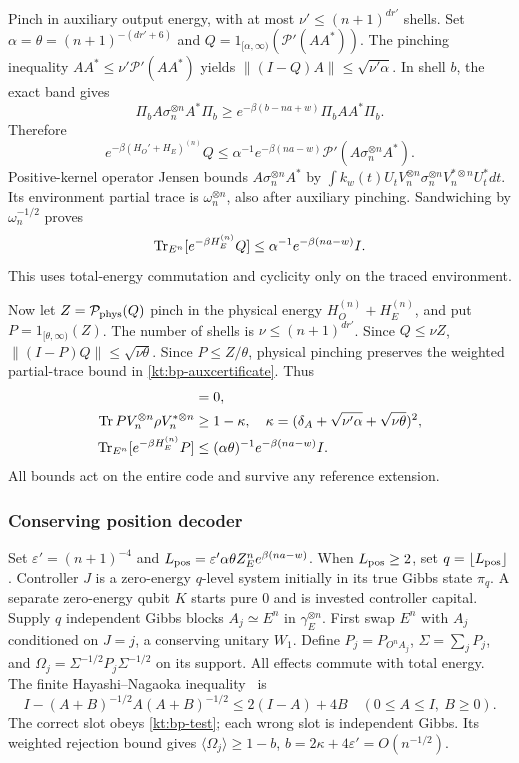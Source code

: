 Pinch in auxiliary output energy, with at most $\nu'\le(n+1)^{dr'}$
shells. Set $\alpha=\theta=(n+1)^{-(dr'+6)}$ and
$Q=1_{[\alpha,\infty)}(\mathcal P'(AA^*))$.
The pinching inequality $AA^*\le\nu'\mathcal P'(AA^*)$ yields
$\|(I-Q)A\|\le\sqrt{\nu'\alpha}$. In shell $b$, the exact band gives
\[
 \Pi_bA\sigma_n^{\otimes n}A^*\Pi_b
 \ge e^{-\beta(b-na+w)}\Pi_bAA^*\Pi_b.
\]
Therefore
\[
 e^{-\beta(H_O'+H_E)^{(n)}}Q
 \le\alpha^{-1}e^{-\beta(na-w)}
                  \mathcal P'(A\sigma_n^{\otimes n}A^*).
\]
Positive-kernel operator Jensen bounds $A\sigma_n^{\otimes n}A^*$
by $\int k_w(t)U_tV_n^{\otimes n}\sigma_n^{\otimes n}
V_n^{*\otimes n}U_t^*dt$. Its environment partial trace is
$\omega_n^{\otimes n}$, also after auxiliary pinching.
Sandwiching by $\omega_n^{-1/2}$ proves
\begin{equation}\label{kt:bp-auxcertificate}
 \operatorname{Tr}_{E^n}[e^{-\beta H_E^{(n)}}Q]
       \le\alpha^{-1}e^{-\beta(na-w)}I.
\end{equation}
This uses total-energy commutation and cyclicity only on the traced
environment.

Now let $Z=\mathcal P_{\rm phys}(Q)$ pinch in the physical energy
$H_O^{(n)}+H_E^{(n)}$, and put $P=1_{[\theta,\infty)}(Z)$.
The number of shells is $\nu\le(n+1)^{dr'}$.
Since $Q\le\nu Z$, $\|(I-P)Q\|\le\sqrt{\nu\theta}$.
Since $P\le Z/\theta$, physical pinching preserves the weighted
partial-trace bound in \eqref{kt:bp-auxcertificate}. Thus
\begin{align}
 [P,H_O^{(n)}+H_E^{(n)}]&=0,\nonumber\\
 \Tr PV_n^{\otimes n}\rho V_n^{*\otimes n}
 &\ge1-\kappa,\quad
 \kappa=(\delta_A+\sqrt{\nu'\alpha}+\sqrt{\nu\theta})^2,\label{kt:bp-test}\\
 \Tr_{E^n}[e^{-\beta H_E^{(n)}}P]
 &\le(\alpha\theta)^{-1}e^{-\beta(na-w)}I.\nonumber
\end{align}
All bounds act on the entire code and survive any reference extension.


\subsubsection{Conserving position decoder}
Set $\varepsilon'=(n+1)^{-4}$ and
$L_{\rm pos}=\varepsilon'\alpha\theta Z_E^n e^{\beta(na-w)}$.
When $L_{\rm pos}\ge2$, set $q=\lfloor L_{\rm pos}\rfloor$.
Controller $J$ is a zero-energy $q$-level system initially in its
true Gibbs state $\pi_q$. A separate zero-energy qubit $K$ starts
pure $0$ and is invested controller capital. Supply $q$ independent
Gibbs blocks $A_j\simeq E^n$ in $\gamma_E^{\otimes n}$.
First swap $E^n$ with $A_j$ conditioned on $J=j$, a conserving
unitary $W_1$. Define $P_j=P_{O^nA_j}$,
$\Sigma=\sum_jP_j$, and
$\Omega_j=\Sigma^{-1/2}P_j\Sigma^{-1/2}$ on its support.
All effects commute with total energy. The finite
Hayashi--Nagaoka inequality~\cite[Lemma~2, with $c=1$]{HayashiNagaoka03} is
\[
 I-(A+B)^{-1/2}A(A+B)^{-1/2}\le2(I-A)+4B
 \quad(0\le A\le I,\ B\ge0).
\]
The correct slot obeys \eqref{kt:bp-test}; each wrong slot is independent
Gibbs. Its weighted rejection bound gives
$\langle\Omega_j\rangle\ge1-b$,
$b=2\kappa+4\varepsilon'=O(n^{-1/2})$.

